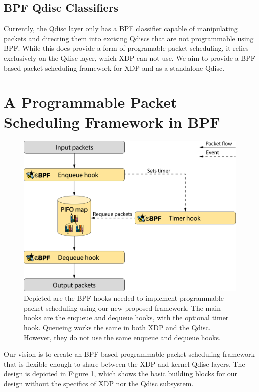 \documentclass[sigconf, nonacm]{acmart}
\begin{document}
\subsection{BPF Qdisc Classifiers}

Currently, the Qdisc layer only has a BPF classifier capable of manipulating packets and directing them into excising Qdiscs that are not programmable using BPF. While this does provide a form of programable packet scheduling, it relies exclusively on the Qdisc layer, which XDP can not use. We aim to provide a BPF based packet scheduling framework for XDP and as a standalone Qdisc.


\section{A Programmable Packet Scheduling Framework in BPF}

\begin{figure}

  \includegraphics[width=\linewidth]{bpf_pps_flow.pdf}

  \caption{Depicted are the BPF hooks needed to implement programmable packet scheduling using our new proposed framework. The main hooks are the enqueue and dequeue hooks, with the optional timer hook. Queueing works the same in both XDP and the Qdisc. However, they do not use the same enqueue and dequeue hooks.\label{fig:bpf_pps_flow}}

\end{figure}

Our vision is to create an BPF based programmable packet scheduling framework that is flexible enough to share between the XDP and kernel Qdisc layers. The design is depicted in Figure \ref{fig:bpf_pps_flow}, which shows the basic building blocks for our design without the specifics of XDP nor the Qdisc subsystem.
\end{document}
